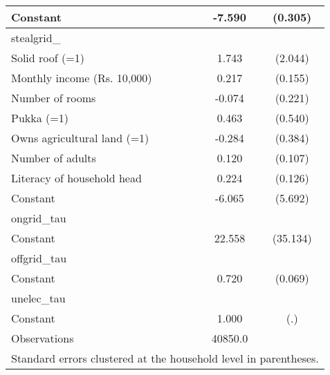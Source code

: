 \begin{table}[htbp]
{\begin{tabular}{l*{1}{cc}}
Constant            &      -7.590\sym{***}&     (0.305)\\
\midrule
stealgrid\_          &                     &            \\
Solid roof (=1)     &       1.743         &     (2.044)\\
Monthly income (Rs. 10,000)&       0.217         &     (0.155)\\
Number of rooms     &      -0.074         &     (0.221)\\
Pukka (=1)          &       0.463         &     (0.540)\\
Owns agricultural land (=1)&      -0.284         &     (0.384)\\
Number of adults    &       0.120         &     (0.107)\\
Literacy of household head&       0.224\sym{*}  &     (0.126)\\
Constant            &      -6.065         &     (5.692)\\
\midrule
ongrid\_tau          &                     &            \\
Constant            &      22.558         &    (35.134)\\
\midrule
offgrid\_tau         &                     &            \\
Constant            &       0.720\sym{***}&     (0.069)\\
\midrule
unelec\_tau          &                     &            \\
Constant            &       1.000         &         (.)\\
\midrule
Observations        &     40850.0         &            \\
\bottomrule
\multicolumn{3}{l}{\footnotesize Standard errors clustered at the household level in parentheses.}\\
\end{tabular}}
\end{table}
